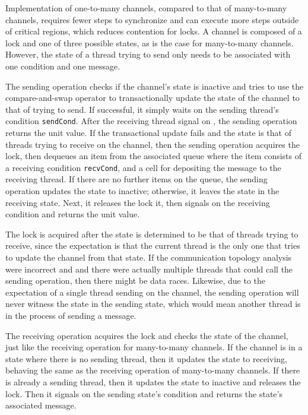 \documentclass[10pt]{article}
\begin{document}
Implementation of one-to-many channels, compared to that of many-to-many channels,
requires fewer
steps to synchronize and can execute more steps outside of critical regions, which reduces
contention for locks. A channel is composed of a lock and one of three possible states, as is
the case for many-to-many channels.  However, the state of a thread trying to send only needs
to be associated with one condition and one message.  

The sending operation checks if the channel's state is inactive and tries to use the
compare-and-swap operator to transactionally update the state of
the channel to that of trying to
send.  If successful, it simply waits on the sending thread's condition \lstinline{sendCond}.
After the receiving thread signal on , the sending operation returns the unit value.
If the transactional update fails and the state is
that of threads trying to receive on the channel, then the sending operation acquires the lock,
then dequeues an item from the associated queue where the item consists of a receiving condition \lstinline{recvCond},
and a cell for depositing the message to the receiving thread.
If there are no further items on the queue, the sending operation updates the state to inactive; otherwise, it
leaves the state in the receiving state.
Next, it releases the lock it, then signals on the receiving condition and returns the unit value.

The lock is acquired after the state is determined to be that of
threads trying to receive, since the expectation is that the current thread is the only one
that tries to update the channel from that state.  If the communication topology analysis were
incorrect and and there were actually multiple threads that could call the sending operation,
then there might be data races.  Likewise, due to the expectation of a single thread
sending on the channel, the sending operation will never witness the state in the sending state,
which would mean another thread is in the process of sending a message.

The receiving operation acquires the lock and checks
the state of the channel, just like the receiving operation for many-to-many channels.
If the channel is in a state where there is no sending thread,
then it updates the state to receiving, behaving the same as the receiving operation of many-to-many channels.
If there is already a sending thread, then it updates the state to inactive and
releases the lock. Then it signals on the sending state's condition and returns the state's associated message.
\end{document}
